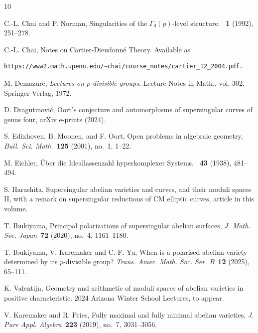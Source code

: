 \documentclass[]{amsart}
\theoremstyle{plain}
\theoremstyle{definition}
\theoremstyle{remark}
\newcommand{\<}{\langle}   %
\renewcommand{\>}{\rangle} %
\begin{document}
\begin{thebibliography}{10}
\def\tp{{to appear}}

\newcommand{\princeton}[1]{Ann. Math. Studies #1, Princeton
  Univ. Press}

\newcommand{\LNM}[1]{Lecture Notes in Math., vol. #1, 
Springer-Verlag}




 C.-L. Chai and P. Norman, Singularities
  of the $\Gamma_0(p)$-level structure. \jag~{\bf 1} (1992), 251--278.

 C.-L. Chai, Notes on Cartier-Dieudonn\'e Theory. Available as 
\begin{verbatim}
https://www2.math.upenn.edu/~chai/course_notes/cartier_12_2004.pdf. \end{verbatim}  

 M. Demazure, {\it Lectures on $p$-divisible groups}. \LNM{302}, 1972.

{D}. {D}ragutinovi{\'c}, Oort's conjecture and automorphisms of supersingular curves of genus four, arXiv e-prints (2024).

S. Edixhoven, B. Moonen, and F. Oort, Open problems in
  algebraic geometry, {\it Bull. Sci. Math.}~\textbf{125} (2001), no.~1, 1--22.
  
 M. Eichler, \"Uber die Ideallassenzahl hyperkomplexer Systems. \mathz~{\bf 43} (1938), 481--494. 

 S. Harashita, Supersingular abelian varieties and curves, and their
moduli spaces II, with a remark on supersingular
reductions of CM elliptic curves, article in this volume. 

T. Ibukiyama, Principal polarizations of supersingular abelian surfaces, {\it J. Math. Soc. Japan}~\textbf{72} (2020), no.~4, 1161--1180.

 T. Ibukiyama, V. Karemaker and C.-F. Yu, When is a polarised abelian variety determined by its $p$-divisible group? {\it Trans. Amer. Math. Soc. Ser. B}~{\bf 12} (2025), 65--111. 

K. Valentijn, Geometry and arithmetic of moduli spaces of abelian varieties in positive characteristic. 2024 Arizona Winter School Lectures, to appear.

 V. Karemaker and R. Pries, Fully maximal and fully minimal abelian varieties, {\it J. Pure Appl. Algebra}~\textbf{223} (2019), no.~7,
  3031--3056.
  

\end{thebibliography}
\end{document}
